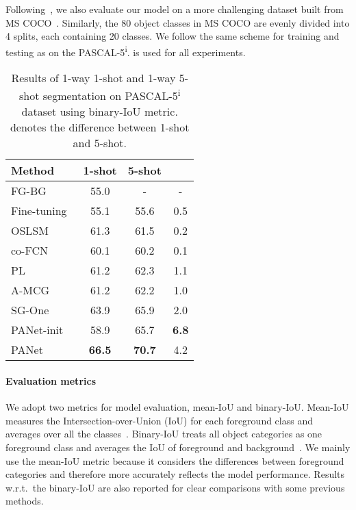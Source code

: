 \documentclass[10pt,twocolumn,letterpaper]{article}
\begin{document}
 Following~\cite{Hu2018AttentionbasedMG}, we also evaluate our model on a more challenging dataset built from MS COCO~\cite{lin2014microsoft}. Similarly, the 80 object classes in MS COCO are evenly divided into 4 splits, each containing 20 classes. We follow the same scheme for training and testing as on the PASCAL-5\textsuperscript{i}.  is used for all experiments.

\begin{table}[t!]
\centering
 \begin{tabular}{l|c c c} 
\toprule
 Method & 1-shot & 5-shot & 
 \\
 \midrule
 FG-BG~\cite{rakelly2018conditional}
        & 55.0 & - & -
 \\
 Fine-tuning~\cite{rakelly2018conditional}
        & 55.1 & 55.6 & 0.5
 \\
 OSLSM~\cite{shaban2017one}
        & 61.3 & 61.5 & 0.2
 \\
 co-FCN~\cite{rakelly2018conditional}
        & 60.1 & 60.2 & 0.1
 \\
 PL~\cite{dong2018few}
        & 61.2 & 62.3 & 1.1
 \\
 A-MCG~\cite{Hu2018AttentionbasedMG}
        & 61.2 & 62.2 & 1.0
 \\
 SG-One~\cite{zhang2018sg}
        & 63.9 & 65.9 & 2.0
 \\
 PANet-init
        & 58.9 & 65.7 & \textbf{6.8}
 \\
 PANet
        & \textbf{66.5} & \textbf{70.7} & 4.2
 \\
\bottomrule
 \end{tabular}
 \caption{Results of 1-way 1-shot and 1-way 5-shot segmentation on PASCAL-5\textsuperscript{i} dataset using binary-IoU metric.  denotes the difference between 1-shot and 5-shot.}
\label{table:pascal_result_binaryIoU}
\end{table}

\vspace{-12pt}
\paragraph{Evaluation metrics} We adopt two metrics for model evaluation, mean-IoU and binary-IoU. Mean-IoU measures the Intersection-over-Union (IoU) for each foreground class and averages over all the classes~\cite{shaban2017one, zhang2018sg}. Binary-IoU treats all object categories as one foreground class and averages the IoU of foreground and background~\cite{rakelly2018conditional, dong2018few, Hu2018AttentionbasedMG}. We mainly use the mean-IoU metric because it considers the differences between foreground categories and therefore more accurately reflects  the model performance. Results w.r.t.\ the binary-IoU are also reported for clear comparisons with some previous methods.
\end{document}
